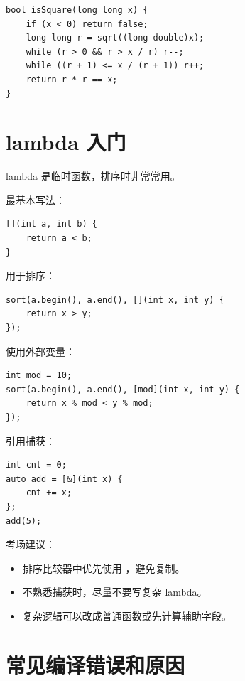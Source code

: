 \begin{lstlisting}
bool isSquare(long long x) {
    if (x < 0) return false;
    long long r = sqrt((long double)x);
    while (r > 0 && r > x / r) r--;
    while ((r + 1) <= x / (r + 1)) r++;
    return r * r == x;
}
\end{lstlisting}

\section{lambda 入门}\label{sec:04-23}

lambda 是临时函数，排序时非常常用。

最基本写法：

\begin{lstlisting}
[](int a, int b) {
    return a < b;
}
\end{lstlisting}

用于排序：

\begin{lstlisting}
sort(a.begin(), a.end(), [](int x, int y) {
    return x > y;
});
\end{lstlisting}

使用外部变量：

\begin{lstlisting}
int mod = 10;
sort(a.begin(), a.end(), [mod](int x, int y) {
    return x % mod < y % mod;
});
\end{lstlisting}

引用捕获：

\begin{lstlisting}
int cnt = 0;
auto add = [&](int x) {
    cnt += x;
};
add(5);
\end{lstlisting}

考场建议：

\begin{itemize}
  \item 排序比较器中优先使用 ，避免复制。
  \item 不熟悉捕获时，尽量不要写复杂 lambda。
  \item 复杂逻辑可以改成普通函数或先计算辅助字段。
\end{itemize}

\section{常见编译错误和原因}\label{sec:04-24}


